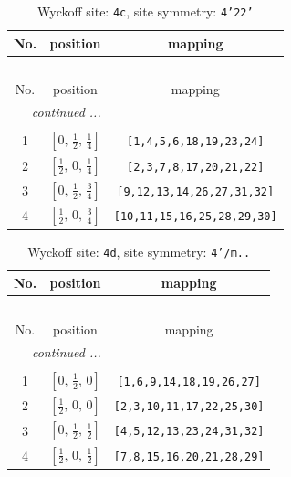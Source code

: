 \documentclass[fleqn,8pt]{jsarticle}
\begin{document}
\renewcommand{\arraystretch}{1.2}
\begin{longtable}{ccc}
\caption{Wyckoff site: {\tt 4c}, site symmetry: {\tt 4'22'}}
 \\
 \hline \hline
No. & position & mapping \\ \hline \endfirsthead

\multicolumn{2}{l}{\tablename\ \thetable{}} \\
 \hline \hline
No. & position & mapping \\ \hline \endhead

 \hline \hline
\multicolumn{2}{r}{\footnotesize\it continued ...} \\ \endfoot

 \hline \hline
\multicolumn{2}{r}{} \\ \endlastfoot

1 & $\left[ 0,\, \frac{1}{2},\, \frac{1}{4} \right]$ & {\tt [1,4,5,6,18,19,23,24]} \\ \hline
2 & $\left[ \frac{1}{2},\, 0,\, \frac{1}{4} \right]$ & {\tt [2,3,7,8,17,20,21,22]} \\ \hline
3 & $\left[ 0,\, \frac{1}{2},\, \frac{3}{4} \right]$ & {\tt [9,12,13,14,26,27,31,32]} \\ \hline
4 & $\left[ \frac{1}{2},\, 0,\, \frac{3}{4} \right]$ & {\tt [10,11,15,16,25,28,29,30]} \\
\end{longtable}
\renewcommand{\arraystretch}{1.2}
\begin{longtable}{ccc}
\caption{Wyckoff site: {\tt 4d}, site symmetry: {\tt 4'/m..}}
 \\
 \hline \hline
No. & position & mapping \\ \hline \endfirsthead

\multicolumn{2}{l}{\tablename\ \thetable{}} \\
 \hline \hline
No. & position & mapping \\ \hline \endhead

 \hline \hline
\multicolumn{2}{r}{\footnotesize\it continued ...} \\ \endfoot

 \hline \hline
\multicolumn{2}{r}{} \\ \endlastfoot

1 & $\left[ 0,\, \frac{1}{2},\, 0 \right]$ & {\tt [1,6,9,14,18,19,26,27]} \\ \hline
2 & $\left[ \frac{1}{2},\, 0,\, 0 \right]$ & {\tt [2,3,10,11,17,22,25,30]} \\ \hline
3 & $\left[ 0,\, \frac{1}{2},\, \frac{1}{2} \right]$ & {\tt [4,5,12,13,23,24,31,32]} \\ \hline
4 & $\left[ \frac{1}{2},\, 0,\, \frac{1}{2} \right]$ & {\tt [7,8,15,16,20,21,28,29]} \\
\end{longtable}
\end{document}
